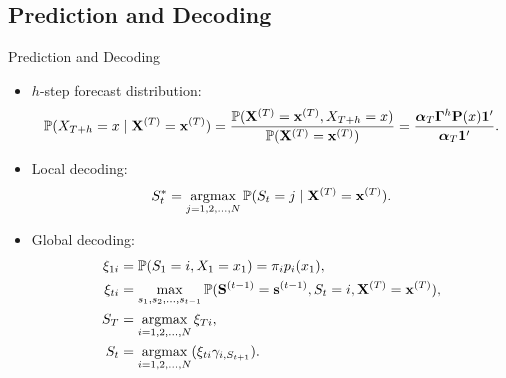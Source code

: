 
\subsection{Prediction and Decoding}

\begin{frame}[fragile,t]{Prediction and Decoding}
	\begin{itemize}
	\item $h$-step forecast distribution:
		\[ \mathbb{P}(X_{T+h} = x \mid {\mathbf X}^{(T)} = {\mathbf x}^{(T)}) = 
		\frac{\mathbb{P}({\mathbf X}^{(T)} = {\mathbf x}^{(T)}, X_{T+h} = x)}{\mathbb{P}({\mathbf X}^{(T)} = {\mathbf x}^{(T)})} 
		= \frac{{\boldsymbol\alpha}_T{\boldsymbol\Gamma}^h{\mathbf P}(x){\mathbf{1}^{\prime}}}{{\boldsymbol\alpha}_T{\mathbf{1}^{\prime}}}. \]
	\item Local decoding:
		\[ S_t^{\ast} = \operatorname*{argmax}_{j = 1,2,\dots,N} \mathbb{P}(S_t = j \mid {\mathbf X}^{(T)} = {\mathbf x}^{(T)}). \]
	\item Global decoding:
		\[ \begin{aligned}
		\xi_{1i} & = \mathbb{P}(S_1 = i,X_1 = x_1) = \pi_ip_i(x_1), \\
		\xi_{ti} & = \max_{s_1,s_2,\dots,s_{t-1}} 
			\mathbb{P}({\mathbf S}^{(t-1)} = {\mathbf s}^{(t-1)},S_t = i, {\mathbf X}^{(T)} = {\mathbf x}^{(T)}), \\
		S_T & = \operatorname*{argmax}_{i = 1,2,\dots,N} \xi_{Ti}, \\
		S_t & = \operatorname*{argmax}_{i = 1,2,\dots,N} (\xi_{ti}\gamma_{i,S_{t+1}}).
		\end{aligned} \]
	\end{itemize}
\end{frame}
